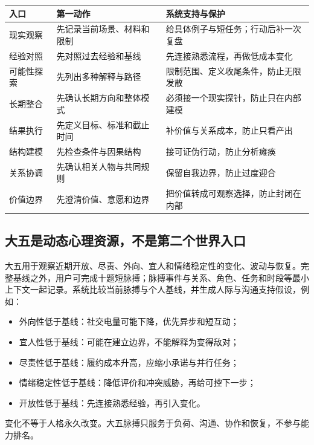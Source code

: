 \documentclass[UTF8,a4paper,11pt]{ctexart}
\begin{document}
\begin{center}
\begin{longtable}{@{}p{2.8cm}p{4.0cm}p{6.4cm}@{}}
\toprule
\textbf{入口} & \textbf{第一动作} & \textbf{系统支持与保护} \\
\midrule
现实观察 & 先记录当前场景、材料和限制 & 给具体例子与短任务；行动后补一次复盘 \\
经验对照 & 先对照过去经验和基线 & 先连接熟悉流程，再做低成本变化 \\
可能性探索 & 先列出多种解释与路径 & 限制范围、定义收尾条件，防止无限发散 \\
长期整合 & 先确认长期方向和整体模式 & 必须接一个现实探针，防止只在内部建模 \\
结果执行 & 先定义目标、标准和截止时间 & 补价值与关系成本，防止只看产出 \\
结构建模 & 先检查条件与因果结构 & 接可证伪行动，防止分析瘫痪 \\
关系协调 & 先确认相关人物与共同规则 & 保留自我边界，防止过度迎合 \\
价值边界 & 先澄清价值、意愿和边界 & 把价值转成可观察选择，防止封闭在内部 \\
\bottomrule
\end{longtable}
\end{center}

\subsection{大五是动态心理资源，不是第二个世界入口}

大五用于观察近期开放、尽责、外向、宜人和情绪稳定性的变化、波动与恢复。完整基线之外，用户可完成十题短脉搏；脉搏事件与关系、角色、任务和时段等最小上下文一起记录。系统比较当前脉搏与个人基线，并生成人际与沟通支持假设，例如：

\begin{itemize}
\item 外向性低于基线：社交电量可能下降，优先异步和短互动；
\item 宜人性低于基线：可能在建立边界，不能解释为变得敌对；
\item 尽责性低于基线：履约成本升高，应缩小承诺与并行任务；
\item 情绪稳定性低于基线：降低评价和冲突威胁，再给可控下一步；
\item 开放性低于基线：先连接熟悉经验，再引入变化。
\end{itemize}

变化不等于人格永久改变。大五脉搏只服务于负荷、沟通、协作和恢复，不参与能力排名。
\end{document}
